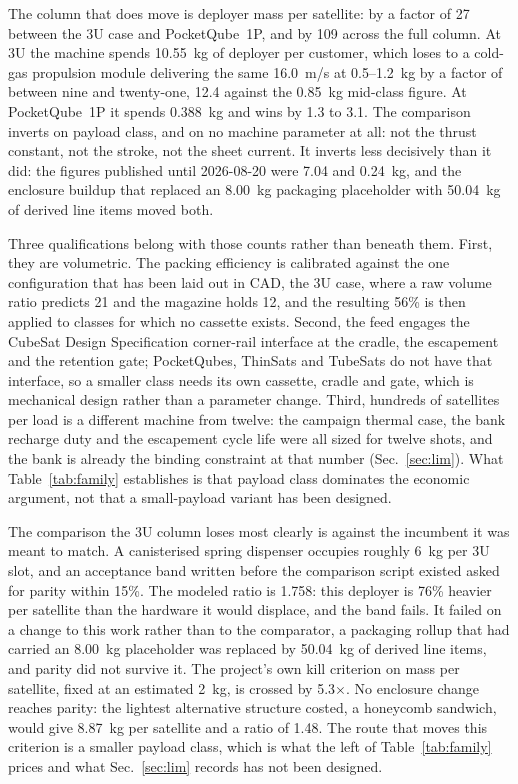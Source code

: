 \documentclass[conference]{IEEEtran}
\begin{document}
The column that does move is deployer mass per satellite: by a factor of 27 between the 3U case and PocketQube~1P, and by 109 across the full column. At 3U the machine spends 10.55~kg of deployer per customer, which loses to a cold-gas propulsion module delivering the same 16.0~m/s at 0.5--1.2~kg by a factor of between nine and twenty-one, 12.4 against the 0.85~kg mid-class figure. At PocketQube~1P it spends 0.388~kg and wins by 1.3 to 3.1. The comparison inverts on payload class, and on no machine parameter at all: not the thrust constant, not the stroke, not the sheet current. It inverts less decisively than it did: the figures published until 2026-08-20 were 7.04 and 0.24~kg, and the enclosure buildup that replaced an 8.00~kg packaging placeholder with 50.04~kg of derived line items moved both.

Three qualifications belong with those counts rather than beneath them. First, they are volumetric. The packing efficiency is calibrated against the one configuration that has been laid out in CAD, the 3U case, where a raw volume ratio predicts 21 and the magazine holds 12, and the resulting 56\% is then applied to classes for which no cassette exists. Second, the feed engages the CubeSat Design Specification corner-rail interface at the cradle, the escapement and the retention gate; PocketQubes, ThinSats and TubeSats do not have that interface, so a smaller class needs its own cassette, cradle and gate, which is mechanical design rather than a parameter change. Third, hundreds of satellites per load is a different machine from twelve: the campaign thermal case, the bank recharge duty and the escapement cycle life were all sized for twelve shots, and the bank is already the binding constraint at that number (Sec.~\ref{sec:lim}). What Table~\ref{tab:family} establishes is that payload class dominates the economic argument, not that a small-payload variant has been designed.

The comparison the 3U column loses most clearly is against the incumbent it was meant to match. A canisterised spring dispenser occupies roughly 6~kg per 3U slot, and an acceptance band written before the comparison script existed asked for parity within 15\%. The modeled ratio is 1.758: this deployer is 76\% heavier per satellite than the hardware it would displace, and the band fails. It failed on a change to this work rather than to the comparator, a packaging rollup that had carried an 8.00~kg placeholder was replaced by 50.04~kg of derived line items, and parity did not survive it. The project's own kill criterion on mass per satellite, fixed at an estimated 2~kg, is crossed by 5.3$\times$. No enclosure change reaches parity: the lightest alternative structure costed, a honeycomb sandwich, would give 8.87~kg per satellite and a ratio of 1.48. The route that moves this criterion is a smaller payload class, which is what the left of Table~\ref{tab:family} prices and what Sec.~\ref{sec:lim} records has not been designed.
\end{document}

